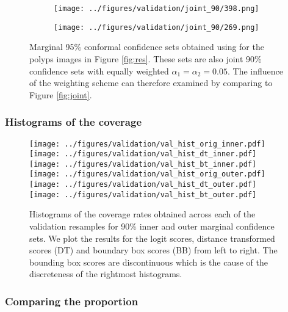 \begin{figure}[h!]
\begin{subfigure}{0.18\textwidth}
		\label{fig:1}
	\end{subfigure}
	\begin{subfigure}{0.18\textwidth}
		\centering
		\texttt{[image: ../figures/validation/joint\_90/398.png]}
		\label{fig:1}
	\end{subfigure}
	\begin{subfigure}{0.18\textwidth}
		\centering
		\texttt{[image: ../figures/validation/joint\_90/269.png]}
		\label{fig:1}
	\end{subfigure}
	\label{fig:grid}
	\caption{Marginal 95\% conformal confidence sets obtained using for the polyps images in Figure \ref{fig:res}. These sets are also joint 90\% confidence sets with equally weighted $\alpha_1 = \alpha_2 = 0.05$. The influence of the weighting scheme can therefore examined by comparing to Figure \ref{fig:joint}.}\label{fig:joint3}
\end{figure}
\newpage
\subsubsection{Histograms of the coverage}
\begin{figure}[h!]
	\begin{center}
		\texttt{[image: ../figures/validation/val\_hist\_orig\_inner.pdf]}
		\texttt{[image: ../figures/validation/val\_hist\_dt\_inner.pdf]}
		\texttt{[image: ../figures/validation/val\_hist\_bt\_inner.pdf]}\\
		\texttt{[image: ../figures/validation/val\_hist\_orig\_outer.pdf]}
		\texttt{[image: ../figures/validation/val\_hist\_dt\_outer.pdf]}
		\texttt{[image: ../figures/validation/val\_hist\_bt\_outer.pdf]}
	\end{center}
	\caption{Histograms of the coverage rates obtained across each of the validation resamples for 90\% inner and outer marginal confidence sets. We plot the results for the logit scores, distance transformed scores (DT) and boundary box scores (BB) from left to right. The bounding box scores are discontinuous which is the cause of the discreteness of the rightmost histograms.}\label{fig:valhist}
\end{figure}

\subsubsection{Comparing the proportion}

